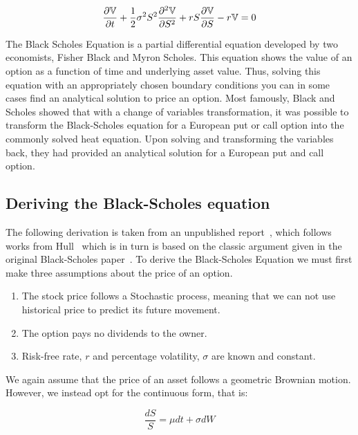 \begin{equation}\label{eqn:BS}
    \frac{\partial \mathbb{V}}{\partial t} + \frac{1}{2}\sigma^2S^2\frac{\partial^2\mathbb{V}}{\partial S^2} + rS\frac{\partial \mathbb{V}}{\partial S} - r\mathbb{V} = 0
\end{equation}

The Black Scholes Equation is a partial differential equation developed by two economists, Fisher Black and Myron Scholes. This equation shows the value of an option as a function of time and underlying asset value. Thus, solving this equation with an appropriately chosen boundary conditions you can in some cases find an analytical solution to price an option. Most famously, Black and Scholes showed that with a change of variables transformation, it was possible to transform the Black-Scholes equation for a European put or call option into the commonly solved heat equation. Upon solving and transforming the variables back, they had provided an analytical solution for a European put and call option.

\subsection{Deriving the Black-Scholes equation}

The following derivation is taken from an unpublished report~\cite{Yr2Project}, which follows works from Hull~\cite{hull2012options} which is in turn is based on the classic argument given in the original Black-Scholes paper~\cite{black1973pricing}. To derive the Black-Scholes Equation we must first make three assumptions about the price of an option.

\begin{enumerate}
    \item The stock price follows a Stochastic process, meaning that we can not use historical price to predict its future movement.
    \item The option pays no dividends to the owner.
    \item Risk-free rate, \(r\) and percentage volatility, \(\sigma \) are known and constant.
\end{enumerate}

We again assume that the price of an asset follows a geometric Brownian motion. However, we instead opt for the continuous form, that is:

\begin{equation}\label{Brownian}
    \frac{dS}{S} = \mu dt + \sigma dW
\end{equation}

